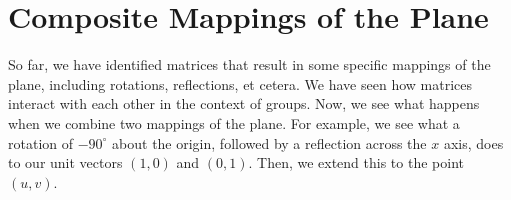 \documentclass[../textbook.tex]{subfiles}
\begin{document}
\section{Composite Mappings of the Plane}

So far, we have identified matrices that result in some specific mappings of the plane, including rotations, reflections, et cetera. We have seen how matrices interact with each other in the context of groups. Now, we see what happens when we combine two mappings of the plane. For example, we see what a rotation of $-90^\circ$ about the origin, followed by a reflection across the $x$ axis, does to our unit vectors $(1,0)$ and $(0,1)$. Then, we extend this to the point $(u,v)$.

\newcommand{\blanktwomat}{\twomat{\phantom{0}}{\phantom{0}}{}{}}
\end{document}
